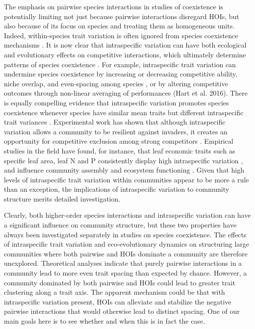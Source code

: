 \documentclass[11pt]{article}
\begin{document}
The emphasis on pairwise species interactions in studies of coexistence is potentially limiting not just because pairwise interactions disregard HOIs, but also because of its focus on species and treating them as homogeneous units. Indeed, within-species trait variation is often ignored from species coexistence mechanisms \citep{siefert_incorporating_2012, hart_how_2016}.  It is now clear that intraspecific variation can have both ecological and evolutionary effects on competitive interactions, which ultimately determine patterns of species coexistence \citep{yamamichi_integrating_2022, pastore_evolution_2021}. For example, intraspecific trait variation can undermine species coexistence by increasing or decreasing competitive ability, niche overlap, and even-spacing among species \citep{barabas_effect_2016}, or by altering competitive outcomes through non-linear averaging of performances (Hart et al. 2016). There is equally compelling evidence that intraspecific variation promotes species coexistence whenever species have similar mean traits but different intraspecific trait variances \citep{bolnick_why_2011, barabas_effect_2016}. Experimental work has shown that although intraspecific variation allows a community to be resilient against invaders, it creates an opportunity for competitive exclusion among strong competitors \citep{hausch_effects_2018}. Empirical studies in the field have found, for instance, that leaf economic traits such as specific leaf area, leaf N and P consistently display high intraspecific variation \citep{meziane_interacting_1999}, and influence community assembly and ecosystem functioning \citep{reich_world-wide_2014}. Given that high levels of intraspecific trait variation within communities appear to be more a rule than an exception, the implications of intraspecific variation to community structure merits detailed investigation.

Clearly, both higher-order species interactions and intraspecific variation can have a significant influence on community structure, but these two properties have always been investigated separately in studies on species coexistence. The effects of intraspecific trait variation and eco-evolutionary dynamics on structuring large communities where both pairwise and HOIs dominate a community are therefore unexplored. Theoretical analyses indicate that purely pairwise interactions in a community lead to more even trait spacing than expected by chance. However, a community dominated by both pairwise and HOIs could lead to greater trait clustering along a trait axis. The apparent mechanism could be that with intraspecific variation present, HOIs can alleviate and stabilize the negative pairwise interactions that would otherwise lead to distinct spacing. One of our main goals here is to see whether and when this is in fact the case.
\end{document}
